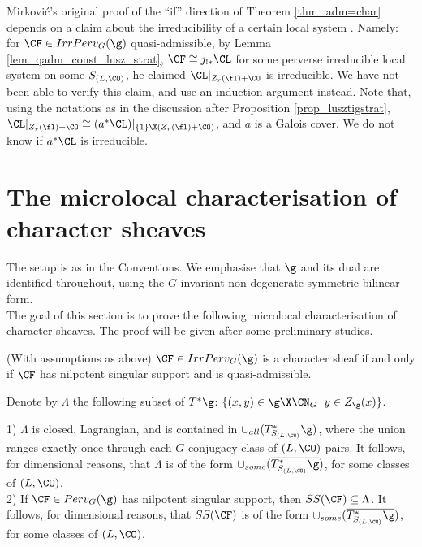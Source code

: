 \begin{remark}\label{rmk_mirk_claim}
     Mirković's original proof of the “if” direction of Theorem \ref{thm_adm=char} depends on a claim about the irreducibility of a certain local system \cite[.ii]{mirkovic_character_2004}. Namely: for $\CF\in IrrPerv_G(\g)$ quasi-admissible, by Lemma \ref{lem_qadm_const_lusz_strat}, $\CF\cong j_{!*}\CL$ for some perverse irreducible local system on some $S_{(L,\CO)}$, he claimed $\CL|_{Z_r(\fl)+\CO}$ is irreducible. We have not been able to verify this claim, and use an induction argument instead. Note that, using the notations as in the discussion after Proposition \ref{prop_lusztigstrat}, $\CL|_{Z_r(\fl)+\CO}\cong (a^*\CL)|_{\{1\}\X(Z_r(\fl)+\CO)}$, and $a$ is a Galois cover. We do not know if $a^*\CL$ is irreducible.
\end{remark}

\section{The microlocal characterisation of character sheaves}\label{sec_characterise_char}
The setup is as in the Conventions. We emphasise that $\g$ and its dual are identified throughout, using the $G$-invariant non-degenerate symmetric bilinear form.\\

The goal of this section is to prove the following microlocal characterisation of character sheaves. The proof will be given after some preliminary studies.

\begin{theorem}\label{thm_characterise_char}
    (With assumptions as above) $\CF\in IrrPerv_G(\g)$ is a character sheaf if and only if $\CF$ has nilpotent singular support and is quasi-admissible.
\end{theorem}

\begin{definition}
    Denote by $\Lambda$ the following subset of $T^*\g$: $\{(x,y)\in\g\X\CN_G\,|\, y\in Z_\g(x)\}$.
\end{definition}

\begin{lemma}\label{lem_form_of_SS}
    1) $\Lambda$ is closed, Lagrangian, and is contained in $\cup_{all} (T^*_{S_{(L,\CO)}}\g)$, where the union ranges exactly once through each $G$-conjugacy class of $(L,\CO)$ pairs. It follows, for dimensional reasons, that $\Lambda$ is of the form $\cup_{some} (\overline{T^*_{S_{(L,\CO)}}\g})$, for some classes of $(L,\CO)$.\\
    2) If $\CF\in Perv_G(\g)$ has nilpotent singular support, then $SS(\CF)\subseteq \Lambda$. It follows, for dimensional reasons, that $SS(\CF)$ is of the form $\cup_{some} (\overline{T^*_{S_{(L,\CO)}}\g})$, for some classes of $(L,\CO)$.
\end{lemma}


